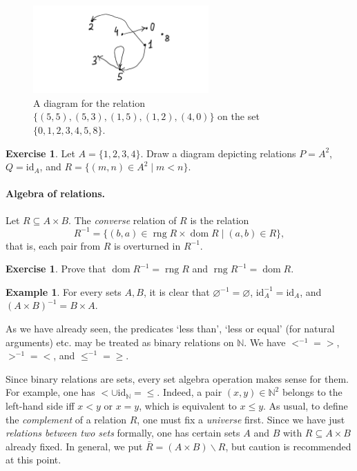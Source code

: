\documentclass[12pt,notitlepage]{article}
\theoremstyle{plain}
\theoremstyle{definition}
\newtheorem{exc}[thm]{Exercise}
\newtheorem{exm}[thm]{Example}
\theoremstyle{plain}
\newcommand{\N}{\mathbb{N}}
\newcommand{\sbs}{\subseteq}
\renewcommand{\setminus}{\smallsetminus}
\newcommand{\void}{\varnothing}
\newcommand{\dom}{\mathop{\mathrm{dom}}}
\newcommand{\rng}{\mathop{\mathrm{rng}}}
\newcommand{\id}{\mathrm{id}}
\newcommand{\1}{\mathbf{1}}
\newcommand{\0}{\mathbf{0}}
\begin{document}
\begin{figure}[h]
\centering
\includegraphics*[width=0.6\textwidth]{rel_diag.pdf}
\caption{A diagram for the relation $\{ (5,5), (5,3), (1,5), (1,2), (4, 0) \}$ on the set $\{0, 1, 2, 3, 4, 5, 8\}$.}
\end{figure}


\begin{exc}
Let $A = \{1,2,3,4\}$. Draw a diagram depicting relations $P = A^2$, $Q = \id_A$, and $R = \{ (m,n) \in A^2 \mid m < n\}$.
\end{exc}

\paragraph{Algebra of relations.} Let $R \sbs A \times B$. The \emph{converse} relation of $R$ is the relation
$$R^{-1} = \{(b,a) \in \rng R \times \dom R \mid (a, b) \in R\},$$
that is, each pair from $R$ is overturned in $R^{-1}$.

\begin{exc}
Prove that $\dom R^{-1} = \rng R$ and $\rng R^{-1} = \dom R$.
\end{exc}

\begin{exm}
For every sets $A, B$, it is clear that $\void^{-1} = \void$, $\id^{-1}_A = \id_A$, and $(A \times B)^{-1} = B \times A$.

As we have already seen, the predicates `less than', `less or equal' (for natural arguments) etc. may be treated as binary relations on $\N$. We have ${<}^{-1} = {>}$, ${>}^{-1} = {<}$, and ${\leq}^{-1} = {\geq}$.
\end{exm}

Since binary relations are sets, every set algebra operation makes sense for them. For example, one has ${<} \cup \id_\N = {\leq}$. Indeed, a pair $(x, y) \in \N^2$ belongs to the left-hand side iff $x < y$ or $x = y$, which is equivalent to $x \leq y$. As usual, to define the \emph{complement} of a relation $R$, one must fix a \emph{universe} first. Since we have just \emph{relations between two sets} formally, one has certain sets $A$ and $B$ with $R \sbs A \times B$ already fixed. In general, we put $\bar R = (A \times B) \setminus R$, but caution is recommended at this point.
\end{document}

